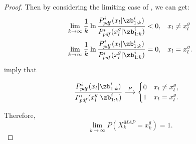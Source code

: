\begin{proof}
		Then by considering the limiting case of , we can get:
			\small\begin{align}
			\lim\limits_{k\rightarrow \infty}\frac{1}{k}\ln\frac{P^i_{pdf}(x_l|\zb^i_{1:k})}{P^i_{pdf}(x^g_l|\zb^i_{1:k})}<0,&\quad x_l\neq x^g_l\label{subeqn:limit1}\\
			\lim\limits_{k\rightarrow \infty}\frac{1}{k}\ln\frac{P^i_{pdf}(x_l|\zb^i_{1:k})}{P^i_{pdf}(x^g_l|\zb^i_{1:k})}=0,&\quad x_l= x^g_l\label{subeqn:limit2}.
			\end{align}\normalsize
		 imply that

		\small\begin{equation*}
		\frac{P^i_{pdf}(x_l|\zb^i_{1:k})}{P^i_{pdf}(x^g_l|\zb^i_{1:k})}\overset{P}{\longrightarrow}
		\begin{cases}
		0\quad x_l\neq x^g_l,\\
		1\quad x_l= x^g_l.
		\end{cases}		
		\end{equation*}\normalsize

		Therefore,
		\small\begin{equation*}
		\lim\limits_{k\rightarrow \infty}
		P(X_k^{MAP}=x^g_k)=1.
		\end{equation*}\normalsize		
		

\end{proof}
